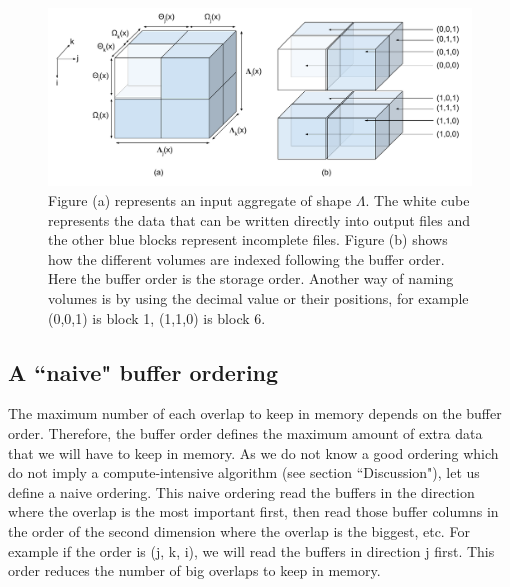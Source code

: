 \documentclass[conference]{IEEEtran}
\begin{document}
\begin{figure}[h]
\centering
\includegraphics[scale=0.45]{./figures/new/nomenclature_overlaps.png}
\caption{Figure (a) represents an input aggregate of shape $\Lambda$. The white cube represents the data that can be written directly into output files and the other blue blocks represent incomplete files. Figure (b) shows how the different volumes are indexed following the buffer order. Here the buffer order is the storage order. Another way of naming volumes is by using the decimal value or their positions, for example (0,0,1) is block 1, (1,1,0) is block 6.
}
\label{fig:nomenclature_overlaps}
\end{figure}

\subsection{A ``naive" buffer ordering}
The maximum number of each overlap to keep in memory depends on the buffer order.
Therefore, the buffer order defines the maximum amount of extra data that we will have to keep in memory.
As we do not know a good ordering which do not imply a compute-intensive algorithm (see section ``Discussion"), let us define a naive ordering.
This naive ordering read the buffers in the direction where the overlap is the most important first, then read those buffer columns in the order of the second dimension where the overlap is the biggest, etc.
For example if the order is (j, k, i), we will read the buffers in direction j first.
This order reduces the number of big overlaps to keep in memory. \\
\end{document}
